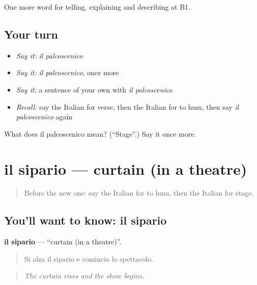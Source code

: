 \begin{grammarlens}[title={What you've built}]
One more word for telling, explaining and describing at B1.
\end{grammarlens}

\subsection*{Your turn}
\begin{itemize}
\raggedright
  \item \emph{Say it:} \emph{il palcoscenico}
  \item \emph{Say it:} \emph{il palcoscenico}, once more
  \item \emph{Say it:} a sentence of your own with \emph{il palcoscenico}
  \item \emph{Recall:} say the Italian for verse, then the Italian for to hum, then say \emph{il palcoscenico} again
\end{itemize}

\begin{tcolorbox}[breakable,colback=teal!4,colframe=teal!35!black,title={Before you move on}]
What does il palcoscenico mean? (\textquotedblleft{}Stage\textquotedblright{}.) Say it once more.
\end{tcolorbox}
\section[il sipario]{il sipario — curtain (in a theatre)}

\label{lesson:IT-C519-sipario}



\begin{quote}
Before the new one: say the Italian for to hum, then the Italian for stage.
\end{quote}

\subsection*{You'll want to know: il sipario}
\textbf{il sipario} — \textquotedblleft{}curtain (in a theatre)\textquotedblright{}.

\begin{quote}
Si alza il sipario e comincia lo spettacolo.
\end{quote}

\begin{quote}
\emph{The curtain rises and the show begins.}
\end{quote}

